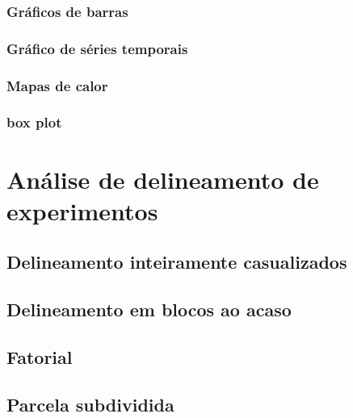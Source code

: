 \documentclass[
]{book}
\begin{document}
\hypertarget{gruxe1ficos-de-barras}{%
\subsection{Gráficos de barras}\label{gruxe1ficos-de-barras}}

\hypertarget{gruxe1fico-de-suxe9ries-temporais}{%
\subsection{Gráfico de séries temporais}\label{gruxe1fico-de-suxe9ries-temporais}}

\hypertarget{mapas-de-calor}{%
\subsection{Mapas de calor}\label{mapas-de-calor}}

\hypertarget{box-plot}{%
\subsection{box plot}\label{box-plot}}

\hypertarget{ade}{%
\chapter{Análise de delineamento de experimentos}\label{ade}}

\hypertarget{delineamento-inteiramente-casualizados}{%
\section{Delineamento inteiramente casualizados}\label{delineamento-inteiramente-casualizados}}

\hypertarget{delineamento-em-blocos-ao-acaso}{%
\section{Delineamento em blocos ao acaso}\label{delineamento-em-blocos-ao-acaso}}

\hypertarget{fatorial}{%
\section{Fatorial}\label{fatorial}}

\hypertarget{parcela-subdividida}{%
\section{Parcela subdividida}\label{parcela-subdividida}}
\end{document}
